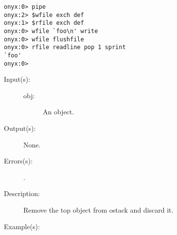 \begin{description}
\begin{description}
\begin{verbatim}
onyx:0> pipe
onyx:2> $wfile exch def
onyx:1> $rfile exch def
onyx:0> wfile `foo\n' write
onyx:0> wfile flushfile
onyx:0> rfile readline pop 1 sprint
`foo'
onyx:0>
		\end{verbatim}
	\end{description}
\label{systemdict:pop}
\item[{\onyxop{obj}{pop}{--}}: ]
	\begin{description}\item[]
	\item[Input(s): ]
		\begin{description}\item[]
		\item[obj: ]
			An object.
		\end{description}
	\item[Output(s): ] None.
	\item[Errors(s): ]
		\begin{description}\item[]
		\item[.]
		\end{description}
	\item[Description: ]
		Remove the top object from ostack and discard it.
	\item[Example(s): ]\begin{verbatim}


\end{verbatim}
\end{description}
\end{description}
